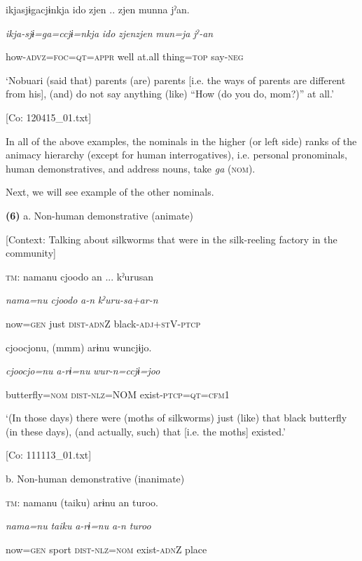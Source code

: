       ikjasjɨgacjɨnkja  ido  zjen .. zjen  munna  jˀan.

      \textit{ikja-sjɨ=ga=ccjɨ=nkja}  \textit{ido}  \textit{zjenzjen}  \textit{mun=ja}  \textit{jˀ-an}

      how-\textsc{advz}=\textsc{foc}=\textsc{qt}=\textsc{appr}  well  at.all  thing=\textsc{top}  say-\textsc{neg}

      ‘Nobuari (said that) parents (are) parents [i.e. the ways of parents are different from his], (and) do not say anything (like) “How (do you do, mom?)” at all.’

      [Co: 120415\_01.txt]

In all of the above examples, the nominals in the higher (or left side) ranks of the animacy hierarchy (except for human interrogatives), i.e. personal pronominals, human demonstratives, and address nouns, take \textit{ga} (\textsc{nom}).

  Next, we will see example of the other nominals.

\textbf{(6)}  a.  Non-human demonstrative (animate)

    [Context: Talking about silkworms that were in the silk-reeling factory in the community]

    \textsc{tm}:  namanu  cjoodo  an ...  kˀurusan

      \textit{nama=nu}  \textit{cjoodo}  \textit{a-n}  \textit{kˀuru-sa+ar-n}

      now=\textsc{gen}  just  \textsc{dist}-\textsc{adn}Z  black-\textsc{adj}+\textsc{st}V-\textsc{ptcp}

      cjoocjonu,  (mmm)  arɨnu  wuncjɨjo.

      \textit{cjoocjo=nu}    \textit{a-rɨ=nu}  \textit{wur-n=ccjɨ=joo}

      butterfly=\textsc{nom}    \textsc{dist}-\textsc{nlz}=NOM  exist-\textsc{ptcp}=\textsc{qt}=\textsc{cfm}1

      ‘(In those days) there were (moths of silkworms) just (like) that black butterfly (in these days), (and actually, such) that [i.e. the moths] existed.’

      [Co: 111113\_01.txt]

  b.  Non-human demonstrative (inanimate)

    \textsc{tm}:  namanu  ({\textbar}taiku{\textbar})  arɨnu  an  turoo.

      \textit{nama=nu}  \textit{taiku}  \textit{a-rɨ=nu}  \textit{a-n}  \textit{turoo}

      now=\textsc{gen}  sport  \textsc{dist}-\textsc{nlz}=\textsc{nom}  exist-\textsc{adn}Z  place

